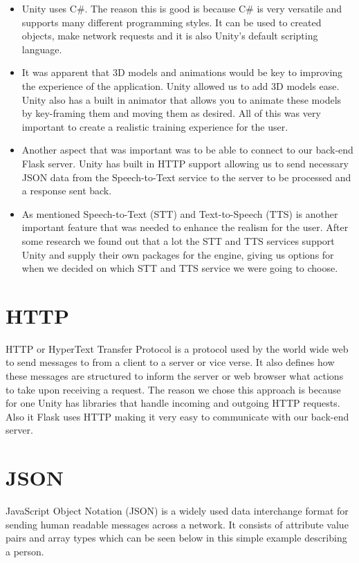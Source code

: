 \begin{itemize}
  \item Unity uses C\#. The reason this is good is because C\# is very versatile and supports many different programming styles. It can be used to created objects, make network requests and it is also Unity's default scripting language.
  \item It was apparent that 3D models and animations would be key to improving the experience of the application. Unity allowed us to add 3D models ease. Unity also has a built in animator that allows you to animate these models by key-framing them and moving them as desired. All of this was very important to create a realistic training experience for the user.
  \item Another aspect that was important was to be able to connect to our back-end Flask server. Unity has built in HTTP support allowing us to send necessary JSON data from the Speech-to-Text service to the server to be processed and a response sent back.
  \item As mentioned Speech-to-Text (STT) and Text-to-Speech (TTS) is another important feature that was needed to enhance the realism for the user. After some research we found out that a lot the STT and TTS services support Unity and supply their own packages for the engine, giving us options for when we decided on which STT and TTS service we were going to choose.
\end{itemize}


\section{HTTP}
HTTP or HyperText Transfer Protocol is a protocol used by the world wide web to send messages to from a client to a server or vice verse. It also defines how these messages are structured to inform the server or web browser what actions to take upon receiving a request. The reason we chose this approach is because for one Unity has libraries that handle incoming and outgoing HTTP requests. Also it Flask uses HTTP making it very easy to communicate with our back-end server.

\section{JSON}
JavaScript Object Notation (JSON) is a widely used data interchange format for sending human readable messages across a network. It consists of attribute value pairs and array types which can be seen below in this simple example describing a person.


